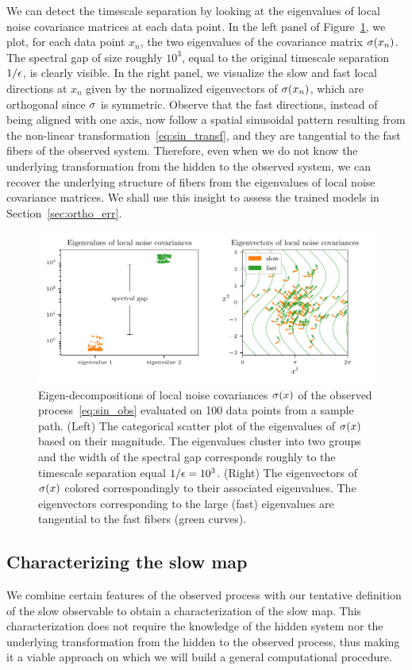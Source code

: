\documentclass{article}
\begin{document}
We can detect the timescale separation by looking at the eigenvalues of local noise covariance matrices at each data point. In the left panel of Figure~\ref{fig:sin2d_lnc_eigvals}, we plot, for each data point $x_n$, the two eigenvalues of the covariance matrix $\sigma(x_n)$. The spectral gap of size roughly $10^3$, equal to the original timescale separation $1/\epsilon$, is clearly visible. In the right panel, we visualize the slow and fast local directions at $x_n$ given by the normalized eigenvectors of $\sigma(x_n)$, which are orthogonal since $\sigma$ is symmetric. Observe that the fast directions, instead of being aligned with one axis, now follow a spatial sinusoidal pattern resulting from the non-linear transformation~\eqref{eq:sin_transf}, and they are tangential to the fast fibers of the observed system. Therefore, even when we do not know the underlying transformation from the hidden to the observed system, we can recover the underlying structure of fibers from the eigenvalues of local noise covariance matrices. We shall use this insight to assess the trained models in Section~\ref{sec:ortho_err}.
\begin{figure}
    \centering
    \includegraphics[draft=false,width=\textwidth]{figs/sin2d_lnc_eigendecomp.pdf}
    \caption{Eigen-decompositions of local noise covariances $\sigma(x)$ of the observed process~\eqref{eq:sin_obs} evaluated on 100 data points from a sample path. (Left) The categorical scatter plot of the eigenvalues of $\sigma(x)$ based on their magnitude. The eigenvalues cluster into two groups and the width of the spectral gap corresponds roughly to the timescale separation equal $1/\epsilon = 10^3$. (Right) The eigenvectors of $\sigma(x)$ colored correspondingly to their associated eigenvalues. The eigenvectors corresponding to the large (fast) eigenvalues are tangential to the fast fibers (green curves).}
    \label{fig:sin2d_lnc_eigvals}
\end{figure}

\subsection{Characterizing the slow map}\label{sec:slow_map}
We combine certain features of the observed process with our tentative definition of the slow observable to obtain a characterization of the slow map. This characterization does not require the knowledge of the hidden system nor the underlying transformation from the hidden to the observed process, thus making it a viable approach on which we will build a general computational procedure.
\end{document}
